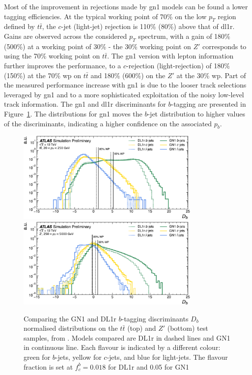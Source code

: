 Most of the improvement in rejections made by \gls{gn1} models can be found a lower tagging efficiencies. At the typical working point of 70\% on the low $p_T$ region defined by $t\bar{t}$, the $c$-jet (light-jet) rejection is 110\% (80\%) above that of \gls{dl1r}. Gains are observed across the considered $p_T$ spectrum, with a gain of 180\% (500\%) at a working point of 30\% - the 30\% working point on $Z'$ corresponds to using the 70\% working point on $t\bar{t}$. The \gls{gn1} version with lepton information further improves the performance, to a $c$-rejection (light-rejection) of 180\% (150\%) at the 70\% \gls{wp} on $t\bar{t}$ and 180\% (600\%) on the $Z'$ at the 30\% \gls{wp}. Part of the measured performance increase with \gls{gn1} is due to the looser track selections leveraged by \gls{gn1} and to a more sophisticated exploitation of the noisy low-level track information. The \gls{gn1} and \gls{dl1r} discriminants for $b$-tagging are presented in Figure~\ref{fig:GN1disb}. The distributions for \gls{gn1} moves the $b$-jet distribution to higher values of the discriminants, indicating a higher confidence on the associated $p_b$. \\

\begin{figure}[h!]
  \centering
  \includegraphics[width=0.8\textwidth]{Images/FTAG/GN/GN1/eff/ttb.png}
  \includegraphics[width=0.8\textwidth]{Images/FTAG/GN/GN1/eff/zpb.png}
  \caption{Comparing the GN1 and DL1r $b$-tagging discriminants $D_b$ normalised distributions on the $t\bar{t}$ (top) and $Z'$ (bottom) test samples, from \cite{ATL-PHYS-PUB-2022-027}. Models compared are DL1r in dashed lines and GN1 in continuous line. Each flavour is indicated by a different colour: green for $b$-jets, yellow for $c$-jets, and blue for light-jets. The flavour fraction is set at $f^b_c = 0.018$ for DL1r and 0.05 for GN1}
  \label{fig:GN1disb}
\end{figure} 

